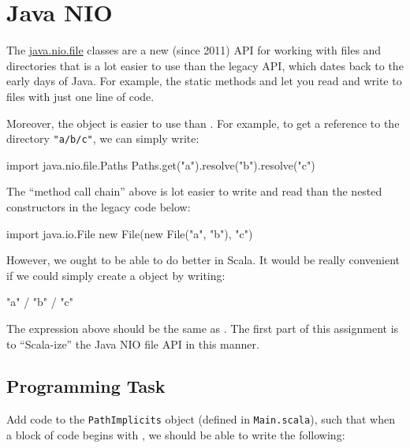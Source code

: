 \documentclass[9pt]{extbook}
\begin{document}
\section{Java NIO}

The \href{https://docs.oracle.com/javase/7/docs/api/java/nio/file/package-summary.html#package_description}{java.nio.file} classes are a new (since 2011) API for working with files and directories that is a lot easier to use than the legacy API, which dates back to the early days of Java. For example, the static methods  and  let you read and write to files with just one line of code.

Moreover, the  object is easier to use than . For example, to get a reference to the directory \texttt{"a/b/c"}, we can simply write:
%
\begin{scalacode}
import java.nio.file.Paths
Paths.get("a").resolve("b").resolve("c")
\end{scalacode}
%
The ``method call chain'' above is lot easier to write and read than the nested constructors in the legacy code below:
%
\begin{scalacode}
import java.io.File
new File(new File("a", "b"), "c")
\end{scalacode}

However, we ought to be able to do better in Scala. It would be really convenient if we could simply create a  object by writing:
%
\begin{scalacode}
"a" / "b" / "c"	
\end{scalacode}
The expression above should be the same as .
The first part of this assignment is to ``Scala-ize'' the Java NIO file API in this manner.

\subsection{Programming Task}

Add code to the \lstinline|PathImplicits| object (defined in \texttt{Main.scala}),
such that when a block of code begins with , 
we should be able to write the following:
\end{document}
